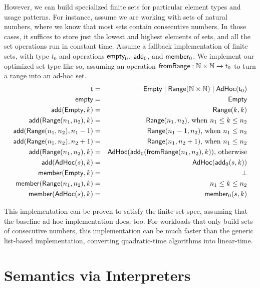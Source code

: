 \documentclass{amsbook}
\theoremstyle{definition}
\theoremstyle{remark}
\numberwithin{section}{chapter}
\numberwithin{equation}{chapter}
\begin{document}
However, we can build specialized finite sets for particular element types and usage patterns.
For instance, assume we are working with sets of natural numbers, where we know that most sets contain consecutive numbers.
In those cases, it suffices to store just the lowest and highest elements of sets, and all the set operations run in constant time.
Assume a fallback implementation of finite sets, with type $t_0$ and operations $\mathsf{empty}_0$, $\mathsf{add}_0$, and $\mathsf{member}_0$.
We implement our optimized set type like so, assuming an operation $\mathsf{fromRange} : \mathbb N \times \mathbb N \to \mathsf{t}_0$ to turn a range into an ad-hoc set.
\begin{eqnarray*}
  \mathsf{t} &=& \mathsf{Empty} \mid \mathsf{Range}(\mathbb N \times \mathbb N) \mid \mathsf{AdHoc}(\mathsf{t}_0) \\
  \mathsf{empty} &=& \mathsf{Empty} \\
  \mathsf{add}(\mathsf{Empty}, k) &=& \mathsf{Range}(k, k) \\
  \mathsf{add}(\mathsf{Range}(n_1, n_2), k) &=& \mathsf{Range}(n_1, n_2)\textrm{, when $n_1 \leq k \leq n_2$} \\
  \mathsf{add}(\mathsf{Range}(n_1, n_2), n_1-1) &=& \mathsf{Range}(n_1-1, n_2)\textrm{, when $n_1 \leq n_2$} \\
  \mathsf{add}(\mathsf{Range}(n_1, n_2), n_2+1) &=& \mathsf{Range}(n_1, n_2+1)\textrm{, when $n_1 \leq n_2$} \\
  \mathsf{add}(\mathsf{Range}(n_1, n_2), k) &=& \mathsf{AdHoc}(\mathsf{add}_0(\mathsf{fromRange}(n_1, n_2), k))\textrm{, otherwise} \\
  \mathsf{add}(\mathsf{AdHoc}(s), k) &=& \mathsf{AdHoc}(\mathsf{add}_0(s, k)) \\
  \mathsf{member}(\mathsf{Empty}, k) &=& \bot \\
  \mathsf{member}(\mathsf{Range}(n_1, n_2), k) &=& n_1 \leq k \leq n_2 \\
  \mathsf{member}(\mathsf{AdHoc}(s), k) &=& \mathsf{member}_0(s, k)
\end{eqnarray*}

This implementation can be proven to satisfy the finite-set spec, assuming that the baseline ad-hoc implementation does, too.
For workloads that only build sets of consecutive numbers, this implementation can be much faster than the generic list-based implementation, converting quadratic-time algorithms into linear-time.



\chapter{\label{interpreters}Semantics via Interpreters}
\end{document}

